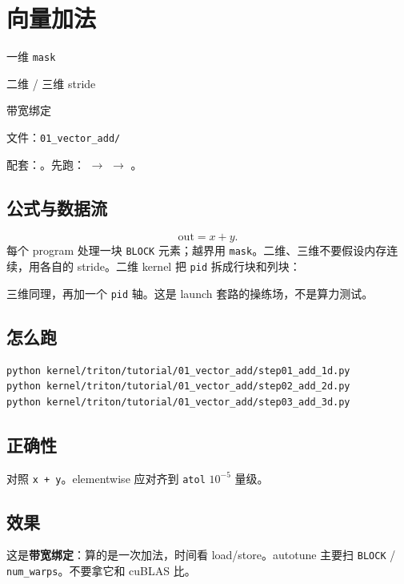 \chapter{向量加法}

\begin{introduction}
  \item 一维 \texttt{mask}
  \item 二维 / 三维 stride
  \item 带宽绑定
  \item 文件：\texttt{01\_vector\_add/}
\end{introduction}

配套：。先跑： $\to$  $\to$ 。

\section{公式与数据流}

\[
\mathrm{out}=x+y.
\]
每个 program 处理一块 \texttt{BLOCK} 元素；越界用 \texttt{mask}。二维、三维不要假设内存连续，用各自的 stride。二维 kernel 把 \texttt{pid} 拆成行块和列块：

\figtiletwo

\figbandwidth


三维同理，再加一个 \texttt{pid} 轴。这是 launch 套路的操练场，不是算力测试。

\section{怎么跑}

\begin{runcmd}
\begin{lstlisting}[style=shell]
python kernel/triton/tutorial/01_vector_add/step01_add_1d.py
python kernel/triton/tutorial/01_vector_add/step02_add_2d.py
python kernel/triton/tutorial/01_vector_add/step03_add_3d.py
\end{lstlisting}
\end{runcmd}

\section{正确性}

\begin{note}
对照 \texttt{x + y}。elementwise 应对齐到 \texttt{atol} $10^{-5}$ 量级。
\end{note}

\section{效果}

\begin{remark}
这是\textbf{带宽绑定}：算的是一次加法，时间看 load/store。autotune 主要扫 \texttt{BLOCK} / \texttt{num\_warps}。不要拿它和 cuBLAS 比。
\end{remark}

